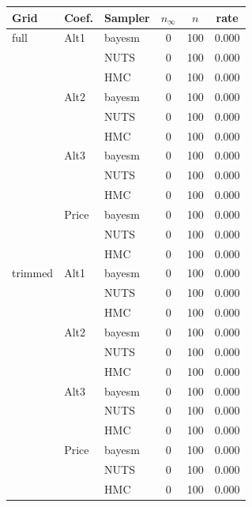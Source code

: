 \begin{tabular}{lllccc}
\toprule
Grid & Coef. & Sampler & $n_\infty$ & $n$ & rate \\
\midrule
full & Alt1 & bayesm & 0 & 100 & 0.000 \\
 &  & NUTS & 0 & 100 & 0.000 \\
 &  & HMC & 0 & 100 & 0.000 \\
 & Alt2 & bayesm & 0 & 100 & 0.000 \\
 &  & NUTS & 0 & 100 & 0.000 \\
 &  & HMC & 0 & 100 & 0.000 \\
 & Alt3 & bayesm & 0 & 100 & 0.000 \\
 &  & NUTS & 0 & 100 & 0.000 \\
 &  & HMC & 0 & 100 & 0.000 \\
 & Price & bayesm & 0 & 100 & 0.000 \\
 &  & NUTS & 0 & 100 & 0.000 \\
 &  & HMC & 0 & 100 & 0.000 \\
trimmed & Alt1 & bayesm & 0 & 100 & 0.000 \\
 &  & NUTS & 0 & 100 & 0.000 \\
 &  & HMC & 0 & 100 & 0.000 \\
 & Alt2 & bayesm & 0 & 100 & 0.000 \\
 &  & NUTS & 0 & 100 & 0.000 \\
 &  & HMC & 0 & 100 & 0.000 \\
 & Alt3 & bayesm & 0 & 100 & 0.000 \\
 &  & NUTS & 0 & 100 & 0.000 \\
 &  & HMC & 0 & 100 & 0.000 \\
 & Price & bayesm & 0 & 100 & 0.000 \\
 &  & NUTS & 0 & 100 & 0.000 \\
 &  & HMC & 0 & 100 & 0.000 \\
\bottomrule
\end{tabular}
